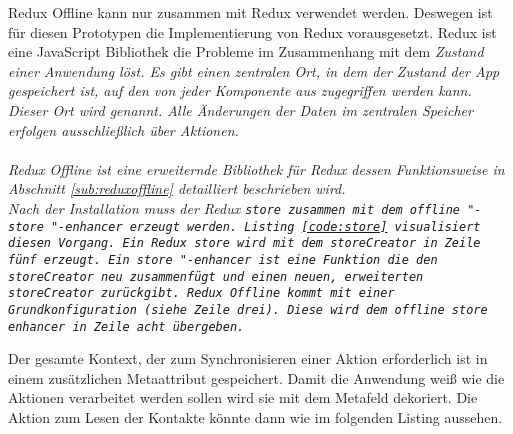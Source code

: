 %
%
Redux Offline kann nur zusammen mit Redux verwendet werden. Deswegen ist für diesen Prototypen die Implementierung von Redux vorausgesetzt.
Redux ist eine JavaScript Bibliothek die Probleme im Zusammenhang mit dem \it{Zustand} einer Anwendung löst.
Es gibt einen zentralen Ort, in dem der \it{Zustand} der App gespeichert ist, auf den von jeder Komponente aus zugegriffen werden kann.
Dieser Ort wird  genannt. Alle Änderungen der Daten im zentralen Speicher erfolgen ausschließlich über Aktionen.\\\\
% 
Redux Offline ist eine erweiternde Bibliothek für Redux dessen Funktionsweise in Abschnitt \ref{sub:reduxoffline} detailliert beschrieben wird.\\
Nach der Installation muss der Redux \tt{store} zusammen mit dem \tt{offline "-store "-enhancer} erzeugt werden. Listing \ref{code:store} visualisiert diesen Vorgang. Ein Redux \tt{store} wird mit dem \tt{storeCreator} in Zeile fünf erzeugt. Ein \tt{store "-enhancer} ist eine Funktion die den \tt{storeCreator} neu zusammenfügt und einen neuen, erweiterten \tt{storeCreator} zurückgibt.
Redux Offline kommt mit einer Grundkonfiguration (siehe Zeile drei). Diese wird dem \tt{offline store enhancer} in Zeile acht übergeben.
\begin{center}
  
\end{center}
Der gesamte Kontext, der zum Synchronisieren einer Aktion erforderlich ist in einem zusätzlichen Metaattribut gespeichert.
Damit die Anwendung weiß wie die Aktionen verarbeitet werden sollen wird sie mit dem Metafeld dekoriert. Die Aktion zum Lesen der Kontakte könnte dann wie im folgenden Listing aussehen.
%
\begin{center}
  
\end{center}
